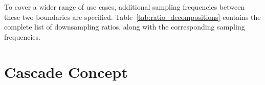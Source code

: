 To cover a  wider range of use cases, additional  sampling frequencies between
these   two  boundaries   are  specified. Table~\ref{tab:ratio_decompositions}
contains  the   complete  list   of  downsampling   ratios,  along   with  the
corresponding sampling frequencies.

\begin{table}
    \centering
    \caption[Downsampling Ratios, Decompositions, and Target Frequencies]{
        The  chosen downsampling  ratios, their  prime factor  decompositions,
        the  downsampling ratios  distribet across  stages, and  the resultant
        sampling rates%
    }
    \label{tab:ratio_decompositions}
\end{table}


%
%
\section{Cascade Concept} %
\label{sec:cascade_concept}

